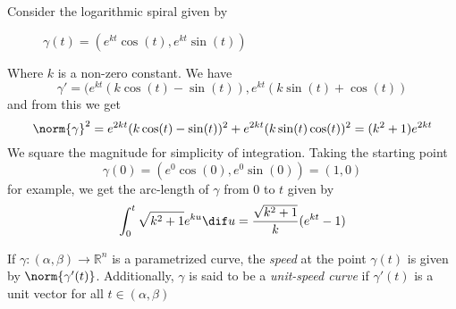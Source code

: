     \begin{example}
        Consider the logarithmic spiral given by
            \begin{figure}[h]
                \centering
                \caption*{\(\gamma(t) = (e^{kt}\cos(t), e^{kt}\sin(t))\)}
            \end{figure}
        Where \(k\) is a non-zero constant. We have
            \[
\gamma' = (e^{kt}(k \cos(t) - \sin(t)), e^{kt}(k \sin(t) + \cos(t))
\]
        and from this we get
            \[
\norm{\gamma}^{2} = e^{2kt}(k \cos(t) - \sin(t))^{2} + e^{2kt}(k \sin(t) \cos(t))^{2} = (k^{2} + 1)e^{2kt}
\]
        We square the magnitude for simplicity of integration. Taking the starting point
            \[
\gamma(0) = (e^{0} \cos(0), e^{0} \sin(0)) = (1, 0)
\]
        for example, we get the arc-length of \(\gamma\) from \(0\) to \(t\) given by
            \[
\int_{0}^{t} \sqrt{k^{2} + 1}e^{ku} \dif u = \frac{\sqrt{k^{2} + 1}}{k}(e^{kt} -1)
\]
    \end{example}

    \begin{definition}
        If \(\gamma : (\alpha, \beta) \rightarrow \mathbb{R}^{n}\) is a parametrized curve, the \textit{speed} at the point \(\gamma(t)\) is given by \(\norm{\gamma'(t)}\). Additionally, \(\gamma\) is said to be a \textit{unit-speed curve} if \(\gamma'(t)\) is a unit vector for all \(t \in (\alpha, \beta)\)
    \end{definition}

